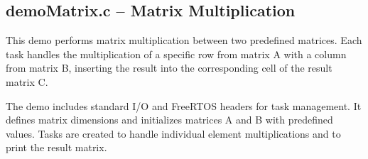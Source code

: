 \documentclass[a4paper, 10pt, oneside]{article} %
\begin{document}
\begin{comment}
    \begin{lstlisting}[language=C, caption={SimpleCounter function}]
void SimpleCounter(){
        int i = 0;
        while(1){
            printf("Task1 Counter: %d\n", i);
            i++;
            vTaskDelay(pdMS_TO_TICKS(1000));
            if (i >= 99999) {
                i = 0;
        }
    }
}
\end{lstlisting}

\begin{lstlisting}[language=C, caption={Task2 function (free heap size)}]
void Task2(){

    while(1){
        /* Wait for a period to gather sufficient runtime statistics */
        vTaskDelay(pdMS_TO_TICKS(5000));

        size_t freeHeapSize = xPortGetFreeHeapSize();
        printf("Free heap size: %u bytes\n", freeHeapSize);

    }
}
\end{lstlisting}
\end{comment}


\subsection{demoMatrix.c -- Matrix Multiplication}

This demo performs matrix multiplication between two predefined matrices. Each task handles the multiplication of a specific row from matrix A with a column from matrix B, inserting the result into the corresponding cell of the result matrix C.

The demo includes standard I/O and FreeRTOS headers for task management. It defines matrix dimensions and initializes matrices A and B with predefined values. Tasks are created to handle individual element multiplications and to print the result matrix.
\end{document}
